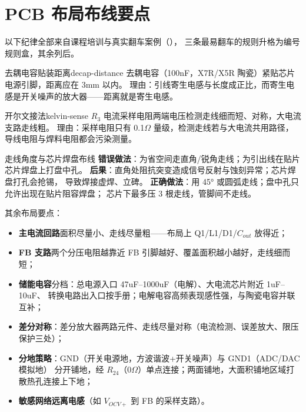 \section{PCB 布局布线要点}

以下纪律全部来自课程培训与真实翻车案例（），
三条最易翻车的规则升格为编号规则盒，其余列后。

\begin{proposition}{去耦电容贴装距离}{decap-distance}
去耦电容（100nF，X7R/X5R 陶瓷）紧贴芯片电源引脚，距离应在 3mm 以内。
理由：引线寄生电感与长度成正比，而寄生电感是开关噪声的放大器——距离就是寄生电感。
\end{proposition}

\begin{proposition}{开尔文接法}{kelvin-sense}
$R_3$ 电流采样电阻两端电压检测走线细而短、对称，大电流支路走线粗。
理由：采样电阻只有 0.1$\Omega$ 量级，检测走线若与大电流共用路径，
导线电阻与焊料电阻都会污染测量。
\end{proposition}

\begin{misconception}{走线角度与芯片焊盘布线}
\textbf{错误做法}：为省空间走直角/锐角走线；为引出线在贴片芯片焊盘上打盘中孔。
\textbf{后果}：直角处阻抗突变造成信号反射与蚀刻异常；芯片焊盘打孔会抢锡，
导致焊接虚焊、立碑。
\textbf{正确做法}：用 45° 或圆弧走线；盘中孔只允许出现在贴片阻容焊盘；
芯片下最多压 3 根走线，管脚间不走线。
\end{misconception}

其余布局要点：
\begin{itemize}
  \item \textbf{主电流回路}面积尽量小、走线尽量粗——布局上 Q1/L1/D1/$C_{out}$ 放得近；
  \item \textbf{FB 支路}两个分压电阻越靠近 FB 引脚越好、覆盖面积越小越好，走线细而短；
  \item \textbf{储能电容}分档：总电源入口 47uF--1000uF（电解）、大电流芯片附近 1uF--10uF、
        转换电路出入口按手册；电解电容高频表现感性强，与陶瓷电容并联互补；
  \item \textbf{差分对称}：差分放大器两路元件、走线尽量对称（电流检测、误差放大、限压保护三处）；
  \item \textbf{分地策略}：GND（开关电源地，方波谐波+开关噪声）与 GND1（ADC/DAC 模拟地）
        分开铺地，经 $R_{24}$（0$\Omega$）单点连接；两面铺地，大面积铺地区域打散热孔连接上下地；
  \item \textbf{敏感网络远离电感}（如 $V_{OCV+}$ 到 FB 的采样支路）。
\end{itemize}

